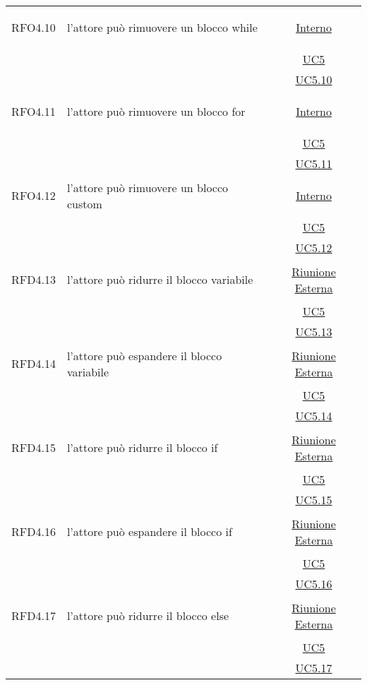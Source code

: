 \begin{longtable}{|c|>{\centering}m{7cm}|c|}
\hypertarget{RFO4.10}{RFO4.10} & l'attore può rimuovere un blocco while & \hyperlink{Interno}{Interno}\\
& &\hyperref[UC5]{UC5}\\
& & \hyperref[UC5.10]{UC5.10}\\ \hline

\hypertarget{RFO4.11}{RFO4.11} & l'attore può rimuovere un blocco for & \hyperlink{Interno}{Interno}\\
& &\hyperref[UC5]{UC5}\\
& &\hyperref[UC5.11]{UC5.11}\\ \hline

\hypertarget{RFO4.12}{RFO4.12} & l'attore può rimuovere un blocco custom & \hyperlink{Interno}{Interno}\\
& &\hyperref[UC5]{UC5}\\
& &\hyperref[UC5.12]{UC5.12}\\ \hline

\hypertarget{RFD4.13}{RFD4.13} & l'attore può ridurre il blocco variabile & \hyperlink{Riunione Esterna}{Riunione Esterna}\\
& &\hyperref[UC5]{UC5}\\
& &\hyperref[UC5.13]{UC5.13}\\ \hline

\hypertarget{RFD4.14}{RFD4.14} & l'attore può espandere il blocco variabile & \hyperlink{Riunione Esterna}{Riunione Esterna}\\
& &\hyperref[UC5]{UC5}\\
& &\hyperref[UC5.14]{UC5.14}\\ \hline

\hypertarget{RFD4.15}{RFD4.15} & l'attore può ridurre il blocco if & \hyperlink{Riunione Esterna}{Riunione Esterna}\\
& &\hyperref[UC5]{UC5}\\
& &\hyperref[UC5.15]{UC5.15}\\ \hline

\hypertarget{RFD4.16}{RFD4.16} & l'attore può espandere il blocco if & \hyperlink{Riunione Esterna}{Riunione Esterna}\\
& &\hyperref[UC5]{UC5}\\
& &\hyperref[UC5.16]{UC5.16}\\ \hline

\hypertarget{RFD4.17}{RFD4.17} & l'attore può ridurre il blocco else & \hyperlink{Riunione Esterna}{Riunione Esterna}\\
& &\hyperref[UC5]{UC5}\\
& & \hyperref[UC5.17]{UC5.17}\\ \hline


\end{longtable}
